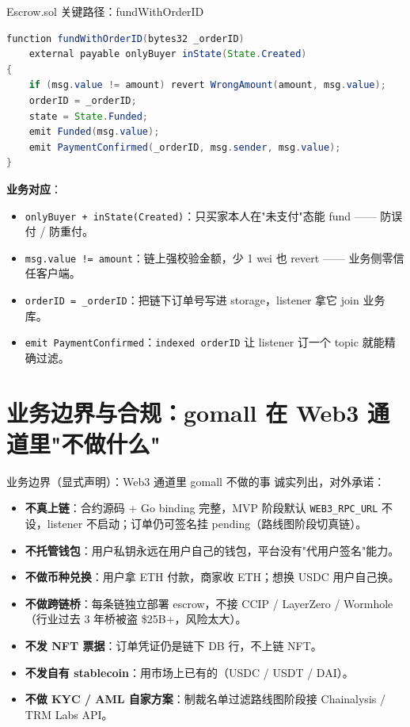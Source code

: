 \documentclass[aspectratio=169,11pt]{beamer}
\begin{document}
\begin{frame}{Escrow.sol 关键路径：fundWithOrderID}
\begin{lstlisting}[language=Java,firstnumber=74,
  caption={}]
function fundWithOrderID(bytes32 _orderID)
    external payable onlyBuyer inState(State.Created)
{
    if (msg.value != amount) revert WrongAmount(amount, msg.value);
    orderID = _orderID;
    state = State.Funded;
    emit Funded(msg.value);
    emit PaymentConfirmed(_orderID, msg.sender, msg.value);
}
\end{lstlisting}
\small \textbf{业务对应}：
\begin{itemize}
  \item \texttt{onlyBuyer + inState(Created)}：只买家本人在"未支付"态能 fund —— 防误付 / 防重付。
  \item \texttt{msg.value != amount}：链上强校验金额，少 1 wei 也 revert —— 业务侧零信任客户端。
  \item \texttt{orderID = \_orderID}：把链下订单号写进 storage，listener 拿它 join 业务库。
  \item \texttt{emit PaymentConfirmed}：\texttt{indexed orderID} 让 listener 订一个 topic 就能精确过滤。
\end{itemize}
\end{frame}

\section{业务边界与合规：gomall 在 Web3 通道里"不做什么"}

\begin{frame}[shrink]{业务边界（显式声明）：Web3 通道里 gomall 不做的事}
诚实列出，对外承诺：
\begin{itemize}
  \item \textbf{不真上链}：合约源码 + Go binding 完整，MVP 阶段默认 \texttt{WEB3\_RPC\_URL} 不设，listener 不启动；订单仍可签名挂 pending（路线图阶段切真链）。
  \item \textbf{不托管钱包}：用户私钥永远在用户自己的钱包，平台没有"代用户签名"能力。
  \item \textbf{不做币种兑换}：用户拿 ETH 付款，商家收 ETH；想换 USDC 用户自己换。
  \item \textbf{不做跨链桥}：每条链独立部署 escrow，不接 CCIP / LayerZero / Wormhole（行业过去 3 年桥被盗 \$25B+，风险太大）。
  \item \textbf{不发 NFT 票据}：订单凭证仍是链下 DB 行，不上链 NFT。
  \item \textbf{不发自有 stablecoin}：用市场上已有的（USDC / USDT / DAI）。
  \item \textbf{不做 KYC / AML 自家方案}：制裁名单过滤路线图阶段接 Chainalysis / TRM Labs API。
\end{itemize}
\end{frame}
\end{document}
